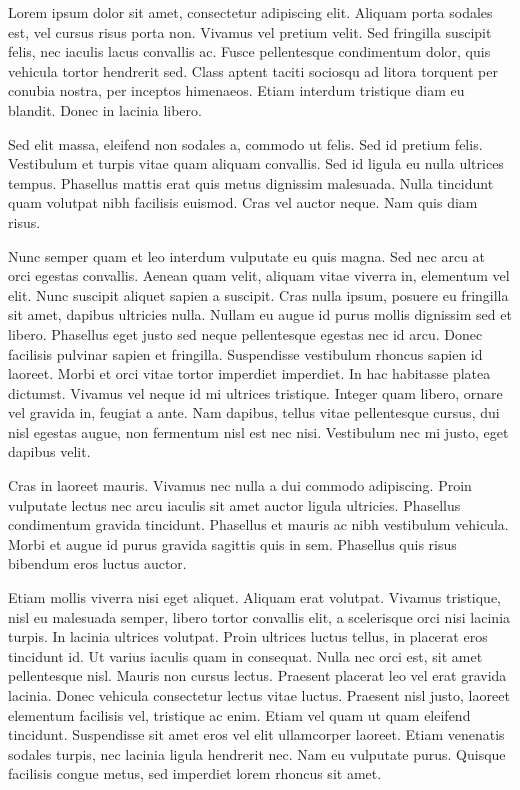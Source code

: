 Lorem ipsum dolor sit amet, consectetur adipiscing elit. Aliquam porta
sodales est, vel cursus risus porta non. Vivamus vel pretium
velit. Sed fringilla suscipit felis, nec iaculis lacus convallis
ac. Fusce pellentesque condimentum dolor, quis vehicula tortor
hendrerit sed. Class aptent taciti sociosqu ad litora torquent per
conubia nostra, per inceptos himenaeos. Etiam interdum tristique diam
eu blandit. Donec in lacinia libero.

Sed elit massa, eleifend non sodales a, commodo ut felis. Sed id
pretium felis. Vestibulum et turpis vitae quam aliquam convallis. Sed
id ligula eu nulla ultrices tempus. Phasellus mattis erat quis metus
dignissim malesuada. Nulla tincidunt quam volutpat nibh facilisis
euismod. Cras vel auctor neque. Nam quis diam risus.

Nunc semper quam et leo interdum vulputate eu quis magna. Sed nec arcu
at orci egestas convallis. Aenean quam velit, aliquam vitae viverra
in, elementum vel elit. Nunc suscipit aliquet sapien a suscipit. Cras
nulla ipsum, posuere eu fringilla sit amet, dapibus ultricies
nulla. Nullam eu augue id purus mollis dignissim sed et
libero. Phasellus eget justo sed neque pellentesque egestas nec id
arcu. Donec facilisis pulvinar sapien et fringilla. Suspendisse
vestibulum rhoncus sapien id laoreet. Morbi et orci vitae tortor
imperdiet imperdiet. In hac habitasse platea dictumst. Vivamus vel
neque id mi ultrices tristique. Integer quam libero, ornare vel
gravida in, feugiat a ante. Nam dapibus, tellus vitae pellentesque
cursus, dui nisl egestas augue, non fermentum nisl est nec
nisi. Vestibulum nec mi justo, eget dapibus velit.

Cras in laoreet mauris. Vivamus nec nulla a dui commodo
adipiscing. Proin vulputate lectus nec arcu iaculis sit amet auctor
ligula ultricies. Phasellus condimentum gravida tincidunt. Phasellus
et mauris ac nibh vestibulum vehicula. Morbi et augue id purus gravida
sagittis quis in sem. Phasellus quis risus bibendum eros luctus
auctor.

Etiam mollis viverra nisi eget aliquet. Aliquam erat volutpat. Vivamus
tristique, nisl eu malesuada semper, libero tortor convallis elit, a
scelerisque orci nisi lacinia turpis. In lacinia ultrices
volutpat. Proin ultrices luctus tellus, in placerat eros tincidunt
id. Ut varius iaculis quam in consequat. Nulla nec orci est, sit amet
pellentesque nisl. Mauris non cursus lectus. Praesent placerat leo vel
erat gravida lacinia. Donec vehicula consectetur lectus vitae
luctus. Praesent nisl justo, laoreet elementum facilisis vel,
tristique ac enim. Etiam vel quam ut quam eleifend
tincidunt. Suspendisse sit amet eros vel elit ullamcorper
laoreet. Etiam venenatis sodales turpis, nec lacinia ligula hendrerit
nec. Nam eu vulputate purus. Quisque facilisis congue metus, sed
imperdiet lorem rhoncus sit amet.

